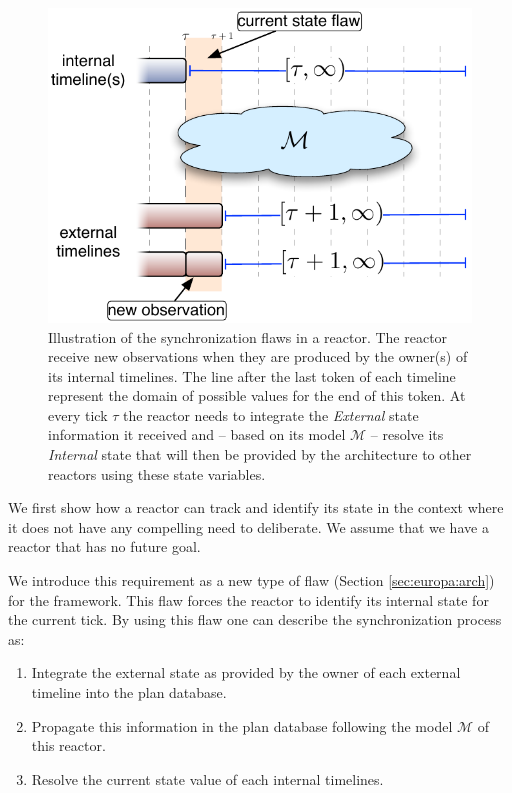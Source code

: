 \begin{figure}[!htbp]
  \centering
  \includegraphics[width=0.5\columnwidth]{figs/synch-relation}
  \caption{\small Illustration of the synchronization flaws in a reactor. The
    reactor receive new observations when they are produced by the
    owner(s) of its internal timelines. The line after the last token
    of each timeline represent the domain of possible values for the
    end of this token. At every tick $\tau$ the reactor needs to
    integrate the {\em External} state information it received and --
    based on its model $\mathcal{M}$ -- resolve its {\em Internal}
    state that will then be provided by the architecture to other
    reactors using these state variables.}
  \label{fig:synch:flaw}
\end{figure}

We first show how a reactor can track and identify its state in the
context where it does not have any compelling need to deliberate. We
assume that we have a reactor that has no future goal. 

We introduce this requirement as a new type of flaw (Section
\ref{sec:europa:arch}) for the \eu framework. This flaw forces the
reactor to identify its internal state for the current tick. By using
this flaw one can describe the synchronization process as:

\begin{enumerate}

\item Integrate the external state as provided by the owner of each
  external timeline into the plan database.

\item Propagate this information in the plan database following the
  model $\mathcal{M}$ of this reactor.

\item Resolve the current state value of each internal timelines.

\end{enumerate}

